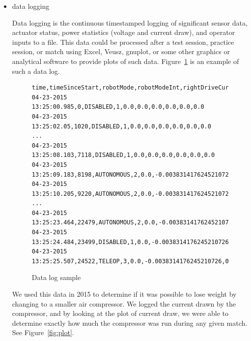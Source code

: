 \documentclass[]{article}
\begin{document}
\begin{itemize}[topsep=0pt]
\item data logging

Data logging is the continuous timestamped logging of significant sensor data, actuator status, power statistics (voltage and current draw), and operator inputs to a file.
This data could be processed after a test session, practice session, or match using Excel, Veusz, gnuplot, or some other graphics or analytical software to provide plots of such data.
Figure~\ref{fig:datalog} is an example of such a data log.

\begin{figure}[h]
\begin{mdframed}
\begin{lstlisting}[basicstyle=\ttfamily\tiny]
time,timeSinceStart,robotMode,robotModeInt,rightDriveCurrent,rightDriveMotorPower,leftDriveCurrent,leftDriveMotorPower,liftMotorCurrent,compressorCurrent
04-23-2015 13:25:00.985,0,DISABLED,1,0.0,0.0,0.0,0.0,0.0,0.0
04-23-2015 13:25:02.05,1020,DISABLED,1,0.0,0.0,0.0,0.0,0.0,0.0
...
04-23-2015 13:25:08.103,7118,DISABLED,1,0.0,0.0,0.0,0.0,0.0,0.0
04-23-2015 13:25:09.183,8198,AUTONOMOUS,2,0.0,-0.0038314176245210726,0.0,-0.0038314176245210726,0.0,0.0
04-23-2015 13:25:10.205,9220,AUTONOMOUS,2,0.0,-0.0038314176245210726,0.0,-0.0038314176245210726,0.0,0.0
...
04-23-2015 13:25:23.464,22479,AUTONOMOUS,2,0.0,-0.0038314176245210726,0.0,-0.0038314176245210726,0.0,0.0
04-23-2015 13:25:24.484,23499,DISABLED,1,0.0,-0.0038314176245210726,0.0,-0.0038314176245210726,0.0,0.0
04-23-2015 13:25:25.507,24522,TELEOP,3,0.0,-0.0038314176245210726,0.0,-0.0038314176245210726,0.0,0.0
\end{lstlisting}
\caption{Data log sample}
\label{fig:datalog}
\end{mdframed}
\end{figure}

We used this data in 2015 to determine if it was possible to lose weight by changing to a smaller air compressor.
We logged the current drawn by the compressor, and by looking at the plot of current draw, we were able to determine exactly how much the compressor was run during any given match. See Figure~\ref{fig:plot}.


\end{itemize}
\end{document}
